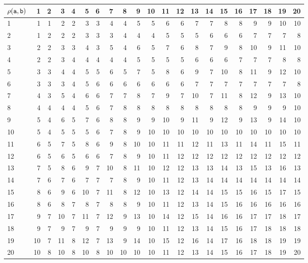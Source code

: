 \begin{tabular}{l|rrrrrrrrrrrrrrrrrrrr}
 $\rho(\mathtt{a},\mathtt{b})$ &  1 & 2 &  3 & 4 &  5 & 6 &  7 &  8 &  9 & 10 & 11 & 12 & 13 & 14 & 15 & 16 & 17 & 18 & 19 & 20 \\
\hline
 1        &  1 & 1 &  2 & 2 &  3 & 3 &  4 &  4 &  5 &  5 &  6 &  6 &  7 &  7 &  8 &  8 &  9 &  9 & 10 & 10 \\
 2        &  1 & 2 &  2 & 2 &  3 & 3 &  3 &  4 &  4 &  4 &  5 &  5 &  5 &  6 &  6 &  6 &  7 &  7 &  7 &  8 \\
 3        &  2 & 2 &  3 & 3 &  4 & 3 &  5 &  4 &  6 &  5 &  7 &  6 &  8 &  7 &  9 &  8 & 10 &  9 & 11 & 10 \\
 4        &  2 & 2 &  3 & 4 &  4 & 4 &  4 &  4 &  5 &  5 &  5 &  5 &  6 &  6 &  6 &  7 &  7 &  7 &  8 &  8 \\
 5        &  3 & 3 &  4 & 4 &  5 & 5 &  6 &  5 &  7 &  5 &  8 &  6 &  9 &  7 & 10 &  8 & 11 &  9 & 12 & 10 \\
 6        &  3 & 3 &  3 & 4 &  5 & 6 &  6 &  6 &  6 &  6 &  6 &  6 &  7 &  7 &  7 &  7 &  7 &  7 &  7 &  8 \\
 7        &  4 & 3 &  5 & 4 &  6 & 6 &  7 &  7 &  8 &  7 &  9 &  7 & 10 &  7 & 11 &  8 & 12 &  9 & 13 & 10 \\
 8        &  4 & 4 &  4 & 4 &  5 & 6 &  7 &  8 &  8 &  8 &  8 &  8 &  8 &  8 &  8 &  8 &  9 &  9 &  9 & 10 \\
 9        &  5 & 4 &  6 & 5 &  7 & 6 &  8 &  8 &  9 &  9 & 10 &  9 & 11 &  9 & 12 &  9 & 13 &  9 & 14 & 10 \\
 10       &  5 & 4 &  5 & 5 &  5 & 6 &  7 &  8 &  9 & 10 & 10 & 10 & 10 & 10 & 10 & 10 & 10 & 10 & 10 & 10 \\
 11       &  6 & 5 &  7 & 5 &  8 & 6 &  9 &  8 & 10 & 10 & 11 & 11 & 12 & 11 & 13 & 11 & 14 & 11 & 15 & 11 \\
 12       &  6 & 5 &  6 & 5 &  6 & 6 &  7 &  8 &  9 & 10 & 11 & 12 & 12 & 12 & 12 & 12 & 12 & 12 & 12 & 12 \\
 13       &  7 & 5 &  8 & 6 &  9 & 7 & 10 &  8 & 11 & 10 & 12 & 12 & 13 & 13 & 14 & 13 & 15 & 13 & 16 & 13 \\
 14       &  7 & 6 &  7 & 6 &  7 & 7 &  7 &  8 &  9 & 10 & 11 & 12 & 13 & 14 & 14 & 14 & 14 & 14 & 14 & 14 \\
 15       &  8 & 6 &  9 & 6 & 10 & 7 & 11 &  8 & 12 & 10 & 13 & 12 & 14 & 14 & 15 & 15 & 16 & 15 & 17 & 15 \\
 16       &  8 & 6 &  8 & 7 &  8 & 7 &  8 &  8 &  9 & 10 & 11 & 12 & 13 & 14 & 15 & 16 & 16 & 16 & 16 & 16 \\
 17       &  9 & 7 & 10 & 7 & 11 & 7 & 12 &  9 & 13 & 10 & 14 & 12 & 15 & 14 & 16 & 16 & 17 & 17 & 18 & 17 \\
 18       &  9 & 7 &  9 & 7 &  9 & 7 &  9 &  9 &  9 & 10 & 11 & 12 & 13 & 14 & 15 & 16 & 17 & 18 & 18 & 18 \\
 19       & 10 & 7 & 11 & 8 & 12 & 7 & 13 &  9 & 14 & 10 & 15 & 12 & 16 & 14 & 17 & 16 & 18 & 18 & 19 & 19 \\
 20       & 10 & 8 & 10 & 8 & 10 & 8 & 10 & 10 & 10 & 10 & 11 & 12 & 13 & 14 & 15 & 16 & 17 & 18 & 19 & 20 \\
\hline
\end{tabular}
